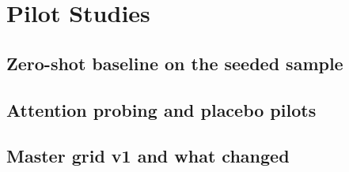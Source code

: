 \section{Pilot Studies}
\label{app:pilots}

\subsection{Zero-shot baseline on the seeded sample}

\subsection{Attention probing and placebo pilots}

\subsection{Master grid v1 and what changed}

